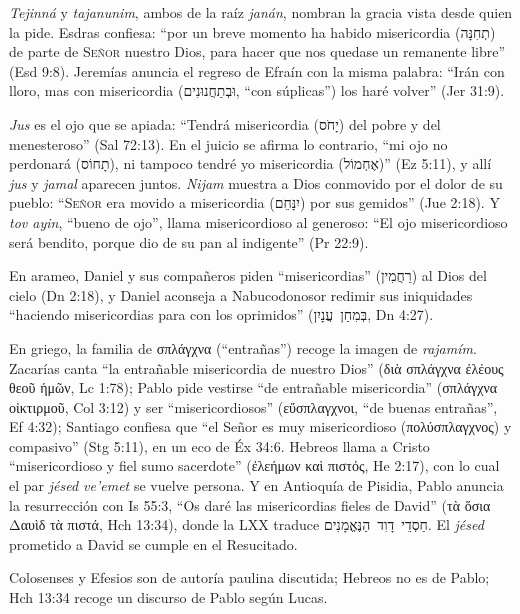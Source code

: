 \documentclass[11pt,letterpaper]{article}
\newcommand{\heb}[1]{\mbox{\foreignlanguage{hebrew}{#1}}}
\newcommand{\grc}[1]{\foreignlanguage{ancientgreek}{#1}}
\newcommand{\SENOR}{\textsc{Señor}}
\begin{document}
\emph{Tejinná} y \emph{tajanunim}, ambos de la raíz \emph{janán}, nombran la gracia vista desde quien la pide. Esdras confiesa: ``por un breve momento ha habido misericordia (\heb{תְחִנָּה}) de parte de \SENOR{} nuestro Dios, para hacer que nos quedase un remanente libre'' (Esd 9:8). Jeremías anuncia el regreso de Efraín con la misma palabra: ``Irán con lloro, mas con misericordia (\heb{וּבְתַחֲנוּנִים}, ``con súplicas'') los haré volver'' (Jer 31:9).

\emph{Jus} es el ojo que se apiada: ``Tendrá misericordia (\heb{יָחֹס}) del pobre y del menesteroso'' (Sal 72:13). En el juicio se afirma lo contrario, ``mi ojo no perdonará (\heb{תָחוֹס}), ni tampoco tendré yo misericordia (\heb{אֶחְמוֹל})'' (Ez 5:11), y allí \emph{jus} y \emph{jamal} aparecen juntos. \emph{Nijam} muestra a Dios conmovido por el dolor de su pueblo: ``\SENOR{} era movido a misericordia (\heb{יִנָּחֵם}) por sus gemidos'' (Jue 2:18). Y \emph{tov ayin}, ``bueno de ojo'', llama misericordioso al generoso: ``El ojo misericordioso será bendito, porque dio de su pan al indigente'' (Pr 22:9).

En arameo, Daniel y sus compañeros piden ``misericordias'' (\heb{רַחֲמִין}) al Dios del cielo (Dn 2:18), y Daniel aconseja a Nabucodonosor redimir sus iniquidades ``haciendo misericordias para con los oprimidos'' (\heb{בְּמִחַן עֲנָיִן}, Dn 4:27).

En griego, la familia de \grc{σπλάγχνα} (``entrañas'') recoge la imagen de \emph{rajamím}. Zacarías canta ``la entrañable misericordia de nuestro Dios'' (\grc{διὰ σπλάγχνα ἐλέους θεοῦ ἡμῶν}, Lc 1:78); Pablo pide vestirse ``de entrañable misericordia'' (\grc{σπλάγχνα οἰκτιρμοῦ}, Col 3:12) y ser ``misericordiosos'' (\grc{εὔσπλαγχνοι}, ``de buenas entrañas'', Ef 4:32); Santiago confiesa que ``el Señor es muy misericordioso (\grc{πολύσπλαγχνος}) y compasivo'' (Stg 5:11), en un eco de Éx 34:6. Hebreos llama a Cristo ``misericordioso y fiel sumo sacerdote'' (\grc{ἐλεήμων καὶ πιστός}, He 2:17), con lo cual el par \emph{jésed ve'emet} se vuelve persona. Y en Antioquía de Pisidia, Pablo anuncia la resurrección con Is 55:3, ``Os daré las misericordias fieles de David'' (\grc{τὰ ὅσια Δαυὶδ τὰ πιστά}, Hch 13:34), donde la LXX traduce \heb{חַסְדֵי דָוִד הַנֶּאֱמָנִים}. El \emph{jésed} prometido a David se cumple en el Resucitado.

\begin{nota}[Precisión]
Colosenses y Efesios son de autoría paulina discutida; Hebreos no es de Pablo; Hch 13:34 recoge un discurso de Pablo según Lucas.
\end{nota}
\end{document}
